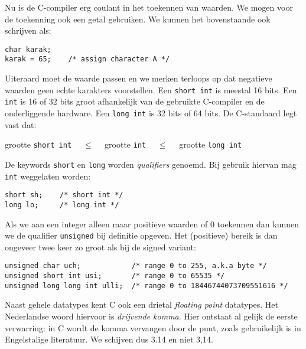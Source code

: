 Nu is de C-compiler erg coulant in het toekennen van waarden. We mogen voor de toekenning ook een getal gebruiken. We kunnen het bovenstaande ook schrijven als:

\hspace*{1em}\texttt{char karak;}\\
\hspace*{1em}\texttt{karak = 65; \ \ \ /* assign character A */}

Uiteraard moet de waarde passen en we merken terloops op dat negatieve waarden geen echte karakters voorstellen. Een \texttt{short int} is meestal 16 bits. Een \texttt{int} is 16 of 32 bits groot afhankelijk van de gebruikte C-compiler en de onderliggende hardware. Een \texttt{long int} is 32 bits of 64 bits. De C-standaard legt vast dat:

\hspace*{1em}grootte \texttt{short int} $\quad\leq\quad$ grootte \texttt{int} $\quad\leq\quad$ grootte \texttt{long int}

De keywords \texttt{short} en \texttt{long} worden \textsl{qualifiers} genoemd. Bij gebruik hiervan mag \texttt{int} weggelaten worden:

\hspace*{1em}\texttt{short sh; \ \ \ /* short int */}\\
\hspace*{1em}\texttt{long lo; \ \ \ \ /* long int */}

Als we aan een integer alleen maar positieve waarden of 0 toekennen dan kunnen we de qualifier \texttt{unsigned} bij definitie opgeven. Het (positieve) bereik is dan ongeveer twee keer zo groot als bij de signed variant:

\hspace*{1em}\texttt{unsigned char uch; \ \ \ \ \ \ \ \ \ \ \ /* range 0 to 255, a.k.a byte */}\\
\hspace*{1em}\texttt{unsigned short int usi; \ \ \ \ \ \ /* range 0 to 65535 */}\\
\hspace*{1em}\texttt{unsigned long long int ulli; \ /* range 0 to 18446744073709551616 */}

Naast gehele datatypes kent C ook een drietal \textsl{floating point} datatypes. Het Nederlandse woord hiervoor is \textsl{drijvende komma}. Hier ontstaat al gelijk de eerste verwarring: in C wordt de komma vervangen door de punt, zoals gebruikelijk is in Engelstalige literatuur. We schijven dus 3.14 en niet 3,14.

